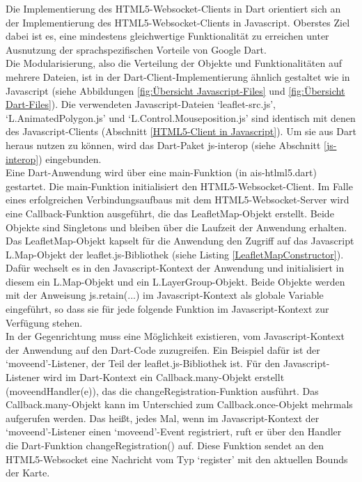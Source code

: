 Die Implementierung des HTML5-Websocket-Clients in Dart orientiert sich an der Implementierung des HTML5-Websocket-Clients in Javascript. Oberstes Ziel dabei ist es, eine mindestens gleichwertige Funktionalität zu erreichen unter Ausnutzung der sprachspezifischen Vorteile von Google Dart. \\
Die Modularisierung, also die Verteilung der Objekte und Funktionalitäten auf mehrere Dateien, ist in der Dart-Client-Implementierung ähnlich gestaltet wie in Javascript (siehe Abbildungen \ref{fig:Übersicht Javascript-Files} und \ref{fig:Übersicht Dart-Files}). Die verwendeten Javascript-Dateien ‘leaflet-src.js’, ‘L.AnimatedPolygon.js’ und ‘L.Control.Mouseposition.js’ sind identisch mit denen des Javascript-Clients (Abschnitt \ref{HTML5-Client in Javascript}). Um sie aus Dart heraus nutzen zu können, wird das Dart-Paket js-interop (siehe Abschnitt \ref{js-interop}) eingebunden.\\
Eine Dart-Anwendung wird über eine main-Funktion (in ais-htlml5.dart) gestartet. Die main-Funktion initialisiert den HTML5-Websocket-Client. Im Falle eines erfolgreichen Verbindungsaufbaus mit dem HTML5-Websocket-Server wird eine Callback-Funktion ausgeführt, die das LeafletMap-Objekt erstellt. Beide Objekte sind Singletons und bleiben über die Laufzeit der Anwendung erhalten.\\
Das LeafletMap-Objekt kapselt für die Anwendung den Zugriff auf das Javascript L.Map-Objekt der leaflet.js-Bibliothek (siehe Listing \ref{LeafletMapConstructor}). Dafür wechselt es in den Javascript-Kontext der Anwendung und initialisiert in diesem ein L.Map-Objekt und ein L.LayerGroup-Objekt. Beide Objekte werden mit der Anweisung js.retain(...) im Javascript-Kontext als globale Variable eingeführt, so dass sie für jede folgende Funktion im Javascript-Kontext zur Verfügung stehen.\\
In der Gegenrichtung muss eine Möglichkeit existieren, vom Javascript-Kontext der Anwendung auf den Dart-Code zuzugreifen. Ein Beispiel dafür ist der ‘moveend’-Listener, der Teil der leaflet.js-Bibliothek ist. Für den Javascript-Listener wird im Dart-Kontext ein Callback.many-Objekt erstellt (moveendHandler(e)), das die changeRegistration-Funktion ausführt. Das Callback.many-Objekt kann im Unterschied zum Callback.once-Objekt mehrmals aufgerufen werden. Das heißt, jedes Mal, wenn im Javascript-Kontext der  ‘moveend’-Listener einen  ‘moveend’-Event registriert, ruft er über den Handler die Dart-Funktion changeRegistration() auf. Diese Funktion sendet an den HTML5-Websocket eine Nachricht vom Typ ‘register’ mit den aktuellen Bounds der Karte.

